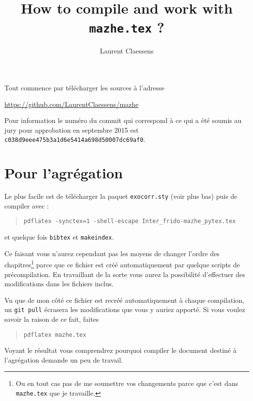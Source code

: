\documentclass[a4paper,12pt]{article}
\newcommand{\info}[1]{\texttt{#1}}
\begin{document}
\title{How to compile and work with \info{mazhe.tex} ?}
\author{Laurent Claessens}
\maketitle

\tableofcontents


Tout commence par télécharger les sources à l'adresse
\begin{center}
    \url{https://github.com/LaurentClaessens/mazhe}
\end{center}

Pour information le numéro du commit qui correspond à ce qui a été soumis au jury pour approbation en septembre 2015 est \info{c038d9eee475b3a1d6e5414a698d50007dc69af0}.

\section{Pour l'agrégation}

Le plus facile est de télécharger la paquet \info{exocorr.sty} (voir plus bas) puis de compiler avec :
\begin{quote}
    \info{pdflatex -synctex=1 -shell-escape Inter\_frido-mazhe\_pytex.tex  }
\end{quote}
et quelque fois \info{bibtex} et \info{makeindex}.

Ce faisant vous n'aurez cependant pas les moyens de changer l'ordre des chapitres\footnote{Ou en tout cas pas de me soumettre vos changements parce que c'est dans \info{mazhe.tex} que je travaille.} parce que ce fichier est créé automatiquement par quelque scripts de précompilation. En travaillant de la sorte vous aurez la possibilité d'effectuer des modifications dans les fichiers inclus.

Vu que de mon côté ce fichier est recréé automatiquement à chaque compilation, un \info{git pull} écrasera les modifications que vous y auriez apporté. Si vous voulez savoir la raison de ce fait, faites
\begin{quote}
    \info{pdflatex mazhe.tex}
\end{quote}
Voyant le résultat vous comprendrez pourquoi compiler le document destiné à l'agrégation demande un peu de travail.
\end{document}
